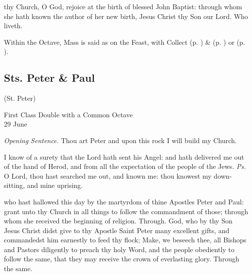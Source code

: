 
\postcommunion\label{JohnPC}
 thy Church, O God, rejoice at the birth of blessed John Baptist: through whom she hath known the author of her new birth, Jesus Christ thy Son our Lord. Who liveth.
\begin{rubric}
    Within the Octave, Mass is said as on the Feast, with  Collect  (p. \pageref{SPMaryInEaster}) \&   (p. \pageref{SPAgainst}) or  (p. \pageref{SPChiefBishop}).
\end{rubric}


\clearpage
\subsection{Sts. Peter \& Paul}

\centerline{\small{(St. Peter)}}

\begin{inhead}
    {First Class Double with a Common Octave\\
29 June}
\end{inhead}
\par\noindent
\textit{Opening Sentence.} Thou art Peter and upon this rock I will build my Church.

\introit
{} I know of a surety that the Lord hath sent his Angel: and hath delivered me out of the hand of Herod, and from all the expectation of the people of the Jews. \textit{Ps.} O Lord, thou hast searched me out, and known me: thou knowest my down-sitting, and mine uprising.

\collect
{} who hast hallowed this day by the martyrdom of thine Apostles Peter and Paul: grant unto thy Church in all things to follow the commandment of those; through whom she received the beginning of religion. Through.
 God, who by thy Son Jesus Christ didst give to thy Apostle Saint Peter many excellent gifts, and commandedst him earnestly to feed thy flock; Make, we beseech thee, all Bishops and Pastors diligently to preach thy holy Word, and the people obediently to follow the same, that they may receive the crown of everlasting glory. Through the same.

